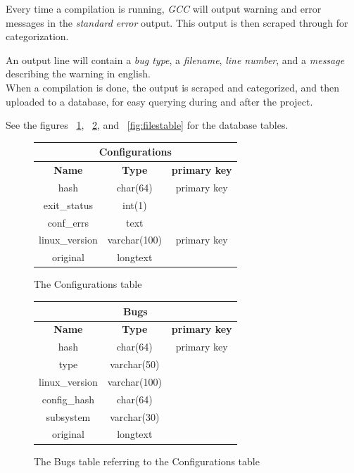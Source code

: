 \documentclass[a4paper,11pt]{report}
\newcommand{\figa}{
    \begin{figure}[!htpb]
    \centering
}
\newcommand{\figb}[2]{
    \caption{#1}
    \label{#2}
    \end{figure}
}
\begin{document}
Every time a compilation is running, \emph{GCC} will output warning and error 
messages in the \emph{standard error} output. This output is then scraped 
through for categorization.

An output line will contain a \emph{bug type}, a \emph{filename}, \emph{line 
number}, and a \emph{message} describing the warning in english.
\\

When a compilation is done, the output is scraped and categorized, and then 
uploaded to a database, for easy querying during and after the project. 

See the figures ~\ref{fig:conftable}, ~\ref{fig:bugstable}, and 
~\ref{fig:filestable} for the database tables.
\\

\figa
    \begin{tabular}{c|c|c}
        \hline 
        \hline
        \multicolumn{3}{c}{\textbf{Configurations}} \\
        \hline
        \textbf{Name} & \textbf{Type} &\textbf{primary key} \\
        \hline
        hash & char(64) & primary key \\
        exit\_status & int(1) \\
        conf\_errs & text \\
        linux\_version & varchar(100) & primary key \\
        original & longtext \\
        \hline
        \hline
    \end{tabular}
\figb{The Configurations table}{fig:conftable}

\figa
    \begin{tabular}{c|c|c}
        \hline
        \hline
        \multicolumn{3}{c}{\textbf{Bugs}} \\
        \hline
        \textbf{Name} & \textbf{Type} &\textbf{primary key} \\
        \hline
        hash & char(64) & primary key \\
        type & varchar(50) \\
        linux\_version & varchar(100) \\
        config\_hash & char(64) \\
        subsystem & varchar(30) \\
        original & longtext \\
        \hline
        \hline
    \end{tabular}
\figb{The Bugs table referring to the Configurations table}{fig:bugstable}
\end{document}

